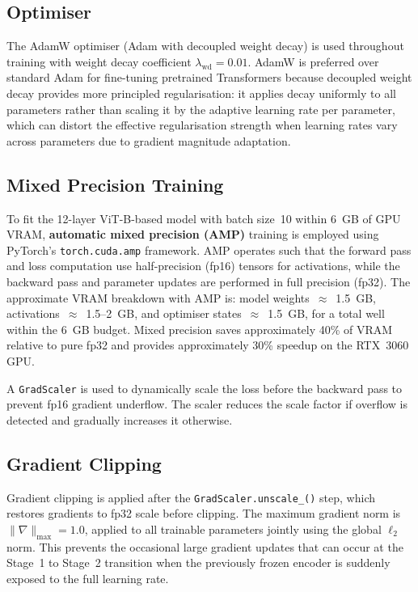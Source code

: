 \subsection{Optimiser}

The AdamW optimiser (Adam with decoupled weight decay) is used throughout training with
weight decay coefficient $\lambda_{\text{wd}} = 0.01$. AdamW is preferred over standard
Adam for fine-tuning pretrained Transformers because decoupled weight decay provides more
principled regularisation: it applies decay uniformly to all parameters rather than
scaling it by the adaptive learning rate per parameter, which can distort the effective
regularisation strength when learning rates vary across parameters due to gradient
magnitude adaptation.

\subsection{Mixed Precision Training}

To fit the 12-layer ViT-B-based model with batch size~10 within 6~GB of GPU VRAM,
\textbf{automatic mixed precision (AMP)} training is employed using PyTorch's
\texttt{torch.cuda.amp} framework. AMP operates such that the forward pass and loss
computation use half-precision (fp16) tensors for activations, while the backward pass
and parameter updates are performed in full precision (fp32). The approximate VRAM
breakdown with AMP is: model weights~$\approx$~1.5~GB, activations~$\approx$~1.5--2~GB,
and optimiser states~$\approx$~1.5~GB, for a total well within the 6~GB budget. Mixed
precision saves approximately 40\% of VRAM relative to pure fp32 and provides
approximately 30\% speedup on the RTX~3060 GPU.

A \texttt{GradScaler} is used to dynamically scale the loss before the backward pass to
prevent fp16 gradient underflow. The scaler reduces the scale factor if overflow is
detected and gradually increases it otherwise.

\subsection{Gradient Clipping}

Gradient clipping is applied after the \texttt{GradScaler.unscale\_()} step, which
restores gradients to fp32 scale before clipping. The maximum gradient norm is
$\|\nabla\|_{\max} = 1.0$, applied to all trainable parameters jointly using the global
$\ell_2$ norm. This prevents the occasional large gradient updates that can occur at the
Stage~1 to Stage~2 transition when the previously frozen encoder is suddenly exposed to
the full learning rate.

